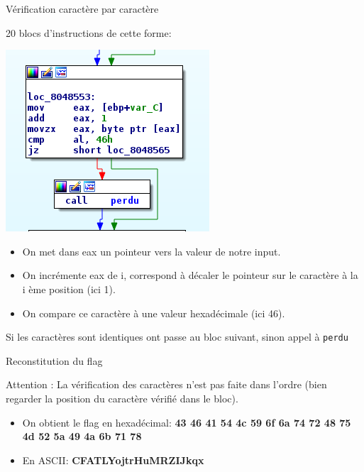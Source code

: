 \documentclass[10pt,sans,usenames,dvipsnames,french,compress]{beamer}
\begin{document}
\begin{frame}[fragile]{Vérification caractère par caractère}
	\begin{block}{}
		20 blocs d'instructions de cette forme:

 		\begin{center}
			\includegraphics[height=0.2\linewidth]{114/cmpcara.png}
		\end{center}
	\end{block}

	\begin{block}{}
		\begin{itemize}
			\item On met dans eax un pointeur vers la valeur de notre input.
			\item On incrémente eax de i, correspond à décaler le pointeur sur le caractère à la i ème position (ici 1).
			\item On compare ce caractère à une valeur hexadécimale (ici 46).
		\end{itemize}
	\end{block}

	\begin{block}{}
		Si les caractères sont identiques ont passe au bloc suivant, sinon appel à \texttt{perdu}
	\end{block}
\end{frame}

\begin{frame}[fragile]{Reconstitution du flag}
	\begin{block}{Attention :}
		La vérification des caractères n'est pas faite dans l'ordre (bien regarder la position du caractère vérifié dans le bloc).
	\end{block}

	\begin{exampleblock}{}
		\begin{itemize}
			\item On obtient le flag en hexadécimal: \textbf{43 46 41 54 4c 59 6f 6a 74 72 48 75 4d 52 5a 49 4a 6b 71 78}
			\item En ASCII: \textbf{CFATLYojtrHuMRZIJkqx}
		\end{itemize}
	\end{exampleblock}
\end{frame}
\end{document}

